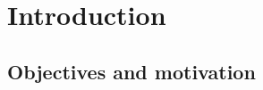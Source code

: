 \clearpage

\chapter{\textbf{Introduction}}\label{objectives}
\blindtext

\section{Objectives and motivation}
\blindtext

